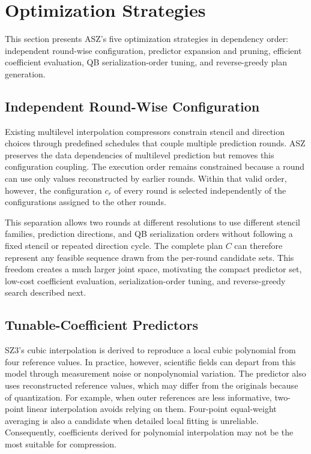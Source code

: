 \section{Optimization Strategies}
\label{sec:optimization-strategies}

This section presents ASZ's five optimization strategies in dependency order: independent round-wise configuration, predictor expansion and pruning, efficient coefficient evaluation, QB serialization-order tuning, and reverse-greedy plan generation.

\subsection{Independent Round-Wise Configuration}
\label{sec:configuration-space:round-wise}

Existing multilevel interpolation compressors constrain stencil and direction choices through predefined schedules that couple multiple prediction rounds. ASZ preserves the data dependencies of multilevel prediction but removes this configuration coupling. The execution order remains constrained because a round can use only values reconstructed by earlier rounds. Within that valid order, however, the configuration $c_r$ of every round is selected independently of the configurations assigned to the other rounds.

This separation allows two rounds at different resolutions to use different stencil families, prediction directions, and QB serialization orders without following a fixed stencil or repeated direction cycle. The complete plan $C$ can therefore represent any feasible sequence drawn from the per-round candidate sets. This freedom creates a much larger joint space, motivating the compact predictor set, low-cost coefficient evaluation, serialization-order tuning, and reverse-greedy search described next.

\subsection{Tunable-Coefficient Predictors}
\label{sec:configuration-space:predictors}

SZ3's cubic interpolation is derived to reproduce a local cubic polynomial from four reference values. In practice, however, scientific fields can depart from this model through measurement noise or nonpolynomial variation. The predictor also uses reconstructed reference values, which may differ from the originals because of quantization. For example, when outer references are less informative, two-point linear interpolation avoids relying on them. Four-point equal-weight averaging is also a candidate when detailed local fitting is unreliable. Consequently, coefficients derived for polynomial interpolation may not be the most suitable for compression.

